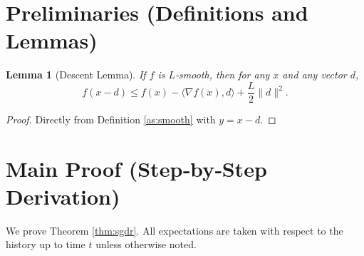 \documentclass{article}
\newtheorem{lemma}{Lemma}
\begin{document}
\newpage
\section*{Preliminaries (Definitions and Lemmas)}
\begin{lemma}[Descent Lemma]\label{lem:descent}
If $f$ is $L$‑smooth, then for any $x$ and any vector $d$,
\[
f(x-d)\le f(x)-\langle\nabla f(x),d\rangle+\frac{L}{2}\|d\|^{2}.
\]
\end{lemma}
\begin{proof}
Directly from Definition \ref{as:smooth} with $y=x-d$.
\end{proof}

\section*{Main Proof (Step‑by‑Step Derivation)}
We prove Theorem \ref{thm:sgdr}.  All expectations are taken with respect to the
history up to time $t$ unless otherwise noted.
\end{document}
